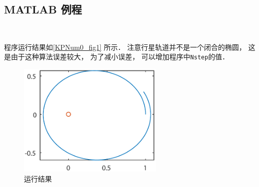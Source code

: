 \subsection{MATLAB 例程}


　

程序运行结果如\autoref{KPNum0_fig1} 所示． 注意行星轨道并不是一个闭合的椭圆， 这是由于这种算法误差较大， 为了减小误差， 可以增加程序中\texttt{Nstep}的值．
\begin{figure}[ht]
\centering
\includegraphics[width=7cm]{./figures/KPNum0.pdf}
\caption{运行结果} \label{KPNum0_fig1}
\end{figure}



